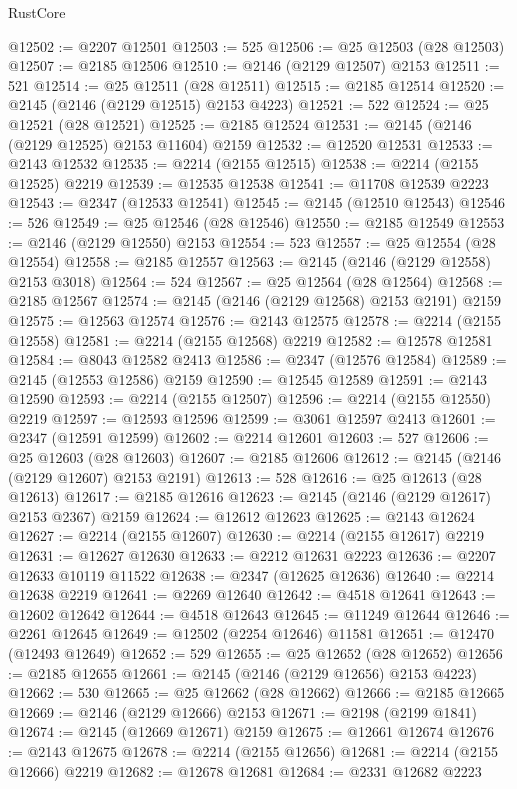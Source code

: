 \begin{lexlean}{RustCore}
\begin{coremodule}
@12502 := @2207 @12501
@12503 := 525
@12506 := @25 @12503 (@28 @12503)
@12507 := @2185 @12506
@12510 := @2146 (@2129 @12507) @2153
@12511 := 521
@12514 := @25 @12511 (@28 @12511)
@12515 := @2185 @12514
@12520 := @2145 (@2146 (@2129 @12515) @2153 @4223)
@12521 := 522
@12524 := @25 @12521 (@28 @12521)
@12525 := @2185 @12524
@12531 := @2145 (@2146 (@2129 @12525) @2153 @11604) @2159
@12532 := @12520 @12531
@12533 := @2143 @12532
@12535 := @2214 (@2155 @12515)
@12538 := @2214 (@2155 @12525) @2219
@12539 := @12535 @12538
@12541 := @11708 @12539 @2223
@12543 := @2347 (@12533 @12541)
@12545 := @2145 (@12510 @12543)
@12546 := 526
@12549 := @25 @12546 (@28 @12546)
@12550 := @2185 @12549
@12553 := @2146 (@2129 @12550) @2153
@12554 := 523
@12557 := @25 @12554 (@28 @12554)
@12558 := @2185 @12557
@12563 := @2145 (@2146 (@2129 @12558) @2153 @3018)
@12564 := 524
@12567 := @25 @12564 (@28 @12564)
@12568 := @2185 @12567
@12574 := @2145 (@2146 (@2129 @12568) @2153 @2191) @2159
@12575 := @12563 @12574
@12576 := @2143 @12575
@12578 := @2214 (@2155 @12558)
@12581 := @2214 (@2155 @12568) @2219
@12582 := @12578 @12581
@12584 := @8043 @12582 @2413
@12586 := @2347 (@12576 @12584)
@12589 := @2145 (@12553 @12586) @2159
@12590 := @12545 @12589
@12591 := @2143 @12590
@12593 := @2214 (@2155 @12507)
@12596 := @2214 (@2155 @12550) @2219
@12597 := @12593 @12596
@12599 := @3061 @12597 @2413
@12601 := @2347 (@12591 @12599)
@12602 := @2214 @12601
@12603 := 527
@12606 := @25 @12603 (@28 @12603)
@12607 := @2185 @12606
@12612 := @2145 (@2146 (@2129 @12607) @2153 @2191)
@12613 := 528
@12616 := @25 @12613 (@28 @12613)
@12617 := @2185 @12616
@12623 := @2145 (@2146 (@2129 @12617) @2153 @2367) @2159
@12624 := @12612 @12623
@12625 := @2143 @12624
@12627 := @2214 (@2155 @12607)
@12630 := @2214 (@2155 @12617) @2219
@12631 := @12627 @12630
@12633 := @2212 @12631 @2223
@12636 := @2207 @12633 @10119 @11522
@12638 := @2347 (@12625 @12636)
@12640 := @2214 @12638 @2219
@12641 := @2269 @12640
@12642 := @4518 @12641
@12643 := @12602 @12642
@12644 := @4518 @12643
@12645 := @11249 @12644
@12646 := @2261 @12645
@12649 := @12502 (@2254 @12646) @11581
@12651 := @12470 (@12493 @12649)
@12652 := 529
@12655 := @25 @12652 (@28 @12652)
@12656 := @2185 @12655
@12661 := @2145 (@2146 (@2129 @12656) @2153 @4223)
@12662 := 530
@12665 := @25 @12662 (@28 @12662)
@12666 := @2185 @12665
@12669 := @2146 (@2129 @12666) @2153
@12671 := @2198 (@2199 @1841)
@12674 := @2145 (@12669 @12671) @2159
@12675 := @12661 @12674
@12676 := @2143 @12675
@12678 := @2214 (@2155 @12656)
@12681 := @2214 (@2155 @12666) @2219
@12682 := @12678 @12681
@12684 := @2331 @12682 @2223

\end{coremodule}
\end{lexlean}
